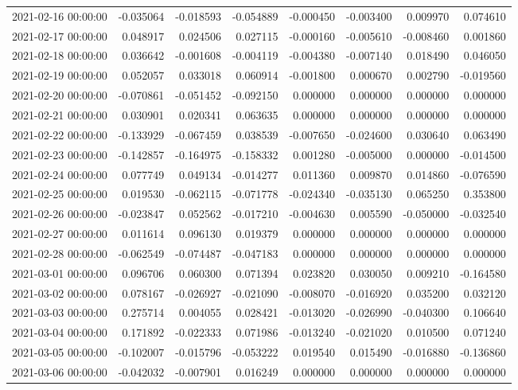 \begin{tabular}{lrrrrrrr}
2021-02-16 00:00:00 & -0.035064 & -0.018593 & -0.054889 & -0.000450 & -0.003400 & 0.009970 & 0.074610 \\
2021-02-17 00:00:00 & 0.048917 & 0.024506 & 0.027115 & -0.000160 & -0.005610 & -0.008460 & 0.001860 \\
2021-02-18 00:00:00 & 0.036642 & -0.001608 & -0.004119 & -0.004380 & -0.007140 & 0.018490 & 0.046050 \\
2021-02-19 00:00:00 & 0.052057 & 0.033018 & 0.060914 & -0.001800 & 0.000670 & 0.002790 & -0.019560 \\
2021-02-20 00:00:00 & -0.070861 & -0.051452 & -0.092150 & 0.000000 & 0.000000 & 0.000000 & 0.000000 \\
2021-02-21 00:00:00 & 0.030901 & 0.020341 & 0.063635 & 0.000000 & 0.000000 & 0.000000 & 0.000000 \\
2021-02-22 00:00:00 & -0.133929 & -0.067459 & 0.038539 & -0.007650 & -0.024600 & 0.030640 & 0.063490 \\
2021-02-23 00:00:00 & -0.142857 & -0.164975 & -0.158332 & 0.001280 & -0.005000 & 0.000000 & -0.014500 \\
2021-02-24 00:00:00 & 0.077749 & 0.049134 & -0.014277 & 0.011360 & 0.009870 & 0.014860 & -0.076590 \\
2021-02-25 00:00:00 & 0.019530 & -0.062115 & -0.071778 & -0.024340 & -0.035130 & 0.065250 & 0.353800 \\
2021-02-26 00:00:00 & -0.023847 & 0.052562 & -0.017210 & -0.004630 & 0.005590 & -0.050000 & -0.032540 \\
2021-02-27 00:00:00 & 0.011614 & 0.096130 & 0.019379 & 0.000000 & 0.000000 & 0.000000 & 0.000000 \\
2021-02-28 00:00:00 & -0.062549 & -0.074487 & -0.047183 & 0.000000 & 0.000000 & 0.000000 & 0.000000 \\
2021-03-01 00:00:00 & 0.096706 & 0.060300 & 0.071394 & 0.023820 & 0.030050 & 0.009210 & -0.164580 \\
2021-03-02 00:00:00 & 0.078167 & -0.026927 & -0.021090 & -0.008070 & -0.016920 & 0.035200 & 0.032120 \\
2021-03-03 00:00:00 & 0.275714 & 0.004055 & 0.028421 & -0.013020 & -0.026990 & -0.040300 & 0.106640 \\
2021-03-04 00:00:00 & 0.171892 & -0.022333 & 0.071986 & -0.013240 & -0.021020 & 0.010500 & 0.071240 \\
2021-03-05 00:00:00 & -0.102007 & -0.015796 & -0.053222 & 0.019540 & 0.015490 & -0.016880 & -0.136860 \\
2021-03-06 00:00:00 & -0.042032 & -0.007901 & 0.016249 & 0.000000 & 0.000000 & 0.000000 & 0.000000 \\

\end{tabular}
